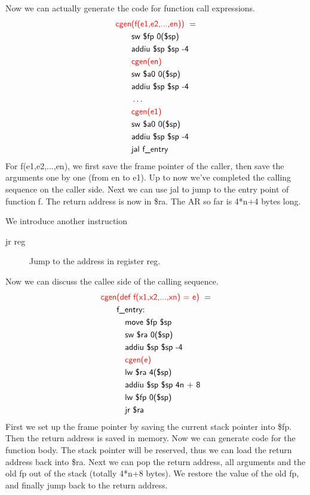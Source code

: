 Now we can actually generate the code for function call expressions. 
\begin{equation*}\begin{split}
\textsf{\color{red}cgen}&\textsf{\color{red}(f(e1,e2,...,en)) }=\\
&\textsf{sw \$fp 0(\$sp)}\\
&\textsf{addiu \$sp \$sp -4}\\
&\textsf{\color{red}cgen(en)}\\
&\textsf{sw \$a0 0(\$sp)}\\
&\textsf{addiu \$sp \$sp -4}\\
&\dots\\
&\textsf{\color{red}cgen(e1)}\\
&\textsf{sw \$a0 0(\$sp)}\\
&\textsf{addiu \$sp \$sp -4}\\
&\textsf{jal f\_entry}
\end{split}\end{equation*}
For \textsf{f(e1,e2,...,en)}, we first save the frame pointer of the caller, then save the arguments one by one (from \textsf{en} to \textsf{e1}). Up to now we've completed the calling sequence on the caller side. Next we can use \textsf{jal} to jump to the entry point of function \textsf{f}. The return address is now in \$ra. The AR so far is \textsf{4*n+4} bytes long.  

We introduce another instruction
\begin{description}
\item[jr reg]Jump to the address in register reg.
\end{description}
Now we can discuss the callee side of the calling sequence. 
\begin{equation*}\begin{split}
\textsf{\color{red}cgen}&\textsf{\color{red}(def f(x1,x2,...,xn) = e) }=\\
&\textsf{f\_entry:}\\
&\quad\textsf{move \$fp \$sp}\\
&\quad\textsf{sw \$ra 0(\$sp)}\\
&\quad\textsf{addiu \$sp \$sp -4}\\
&\quad\textsf{\color{red}cgen(e)}\\
&\quad\textsf{lw \$ra 4(\$sp)}\\
&\quad\textsf{addiu \$sp \$sp 4n + 8}\\
&\quad\textsf{lw \$fp 0(\$sp)}\\
&\quad\textsf{jr \$ra}\\
\end{split}\end{equation*}
First we set up the frame pointer by saving the current stack pointer into \$fp. Then the return address is saved in memory. Now we can generate code for the function body. The stack pointer will be reserved, thus we can load the return address back into \$ra. Next we can pop the return address, all arguments and the old fp out of the stack (totally 4*n+8 bytes). We restore the value of the old fp, and finally jump back to the return address. 

